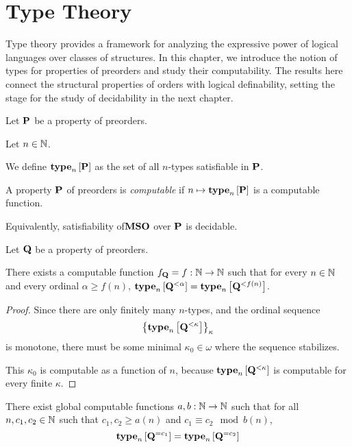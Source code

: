 \section{Type Theory}

Type theory provides a framework for analyzing the expressive power of logical languages over classes of structures. In this chapter, we introduce the notion of types for properties of preorders and study their computability. The results here connect the structural properties of orders with logical definability, setting the stage for the study of decidability in the next chapter.

\begin{definition}
    Let $\mathbf{P}$ be a property of preorders.

    Let $n \in \mathbb{N}$.

    We define $\mathbf{type}_{n} \left[ {\mathbf{P}} \right]$ as the set of all
    $n$-types satisfiable in $\mathbf{P}$.
\end{definition}

\begin{definition}
    A property $\mathbf{P}$ of preorders is \emph{computable} if
    $n \mapsto \mathbf{type}_{n} \left[ {\mathbf{P}} \right]$ is a computable function.

    Equivalently, satisfiability of$\mathbf{MSO}$ over $\mathbf{P}$ is decidable.
\end{definition}

\begin{lemma}\label{f-lemma}
    Let $\mathbf{Q}$ be a property of preorders.

    There exists a computable function $f_{\mathbf{Q}} = f: \mathbb{N} \to \mathbb{N}$ such that
    for every $n \in \mathbb{N}$ and every ordinal $\alpha \ge f(n)$,
    $\mathbf{type}_{n} \left[ {\mathbf{Q}^{< \alpha}} \right] = \mathbf{type}_{n} \left[ {\mathbf{Q}^{< f(n)}} \right]$.
\end{lemma}

\begin{proof}
    Since there are only finitely many $n$-types,
    and the ordinal sequence \[\left\{ {\mathbf{type}_{n} \left[ {\mathbf{Q}^{< \kappa}} \right]} \right\}_{\kappa}\]
    is monotone,
    there must be some minimal $\kappa_0 \in \omega$ where the sequence stabilizes.

    This $\kappa_0$ is computable as a function of $n$, because
    $\mathbf{type}_{n} \left[ {\mathbf{Q}^{< \kappa}} \right]$ is computable for every finite $\kappa$.
\end{proof}

\begin{lemma}\label{ab-lemma}
    There exist global computable functions $a, b : \mathbb{N} \to \mathbb{N}$ such that
    for all $n, c_1, c_2 \in \mathbb{N}$ such that $c_1, c_2 \ge a(n)$ and $c_1 \equiv c_2 \mod b(n)$,
    \[\mathbf{type}_{n} \left[ {\mathbf{Q}^{= c_1}} \right] = \mathbf{type}_{n} \left[ {\mathbf{Q}^{= c_2}} \right]\]
\end{lemma}


